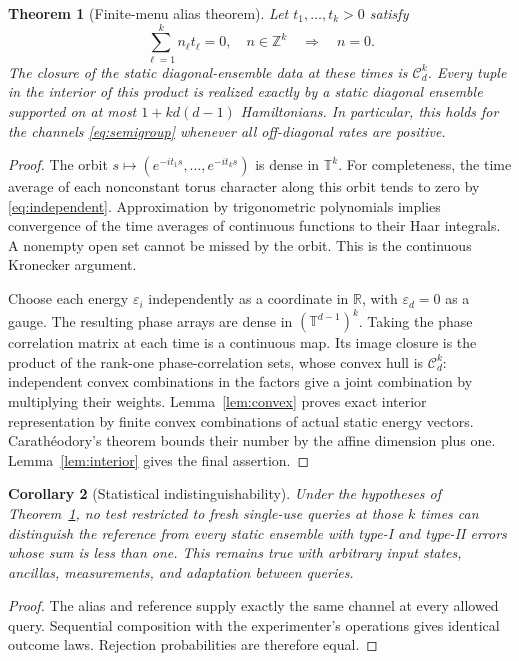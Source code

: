\documentclass[11pt,a4paper]{article}
\newtheorem{theorem}{Theorem}[section]
\newtheorem{corollary}[theorem]{Corollary}
\theoremstyle{remark}\newtheorem{remark}[theorem]{Remark}
\newcommand{\R}{\mathbb R}\newcommand{\C}{\mathbb C}
\newcommand{\T}{\mathbb T}\newcommand{\E}{\mathbb E}
\begin{document}
\begin{theorem}[Finite-menu alias theorem]\label{thm:alias}
Let $t_1,\ldots,t_k>0$ satisfy
\begin{equation}\label{eq:independent}
 \sum_{\ell=1}^k n_\ell t_\ell=0,\quad n\in\mathbb Z^k
 \quad\Longrightarrow\quad n=0.
\end{equation}
The closure of the static diagonal-ensemble data at these times is
$\mathcal C_d^k$. Every tuple in the interior of this product is
realized exactly by a static diagonal ensemble supported on at most
$1+k d(d-1)$ Hamiltonians. In particular, this holds for the channels
\eqref{eq:semigroup} whenever all off-diagonal rates are positive.
\end{theorem}
\begin{proof}
The orbit $s\mapsto(e^{-it_1s},\ldots,e^{-it_ks})$ is dense in $\T^k$.
For completeness, the time average of each nonconstant torus character
along this orbit tends to zero by \eqref{eq:independent}. Approximation
by trigonometric polynomials implies convergence of the time averages
of continuous functions to their Haar integrals. A nonempty open set
cannot be missed by the orbit. This is the continuous Kronecker argument.

Choose each energy $\varepsilon_i$ independently as a coordinate in
$\R$, with $\varepsilon_d=0$ as a gauge. The resulting phase arrays
are dense in $(\T^{d-1})^k$. Taking the phase correlation matrix at
each time is a continuous map. Its image closure is the product of
the rank-one phase-correlation sets, whose convex hull is
$\mathcal C_d^k$: independent convex combinations in the factors give
a joint combination by multiplying their weights.
Lemma~\ref{lem:convex} proves exact interior representation by finite
convex combinations of actual static energy vectors. Carath\'eodory's
theorem bounds their number by the affine dimension plus one.
Lemma~\ref{lem:interior} gives the final assertion.
\end{proof}

\begin{corollary}[Statistical indistinguishability]\label{cor:stats}
Under the hypotheses of Theorem~\ref{thm:alias}, no test restricted to
fresh single-use queries at those $k$ times can distinguish the reference
from every static ensemble with type-I and type-II errors whose sum is
less than one. This remains true with arbitrary input states, ancillas,
measurements, and adaptation between queries.
\end{corollary}
\begin{proof}
The alias and reference supply exactly the same channel at every allowed
query. Sequential composition with the experimenter's operations gives
identical outcome laws. Rejection probabilities are therefore equal.
\end{proof}
\end{document}

